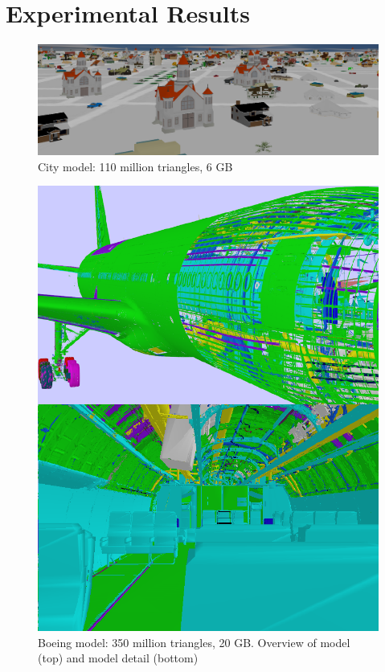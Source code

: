 
\section{Experimental Results}

\begin{figure}[h!]
  \centering
  \includegraphics[width=\columnwidth]{city.png}
  \caption{City model: 110 million triangles, 6 GB }
  \label{fig:model1}
\end{figure}

\begin{figure}[h!]
  \centering
  \includegraphics[width=\columnwidth]{BoeingModel.pdf}
  \caption{Boeing model: 350 million triangles, 20 GB. Overview of model (top) and model detail (bottom)}
  \label{fig:model2}
\end{figure}

